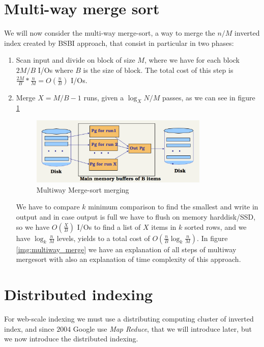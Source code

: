 \section{Multi-way merge sort}
We will now consider the multi-way merge-sort, a way to merge the $n/M$ inverted index created by BSBI approach, that consist
in particular in two phases:
\begin{enumerate}
    \item Scan input and divide on block of size $M$, where we have for each block $2M/B$ I/Os where $B$ 
	  is the size of block.\newline
	  The total cost of this step is $\frac{2M}{B} * \frac{n}{M} = O(\frac{n}{B})$ I/Os.
    \item Merge $X = M/B-1$ runs, given a $\log_X N/M$ passes, as we can see in figure \ref{img:multiWayMerging}

	  \begin{figure}
	      \includegraphics[width=0.8\textwidth]{Images/multiwayMerge}
	      \caption{Multiway Merge-sort merging}
	      \label{img:multiWayMerging}
	  \end{figure}
	  We have to compare $k$ minimum comparison to find the smallest and write in output and in case 
	  output is full we have to flush on memory harddisk/SSD, so we have $O(\frac{X}{B})$ I/Os to find
	  a list of $X$ items in $k$ sorted rows, and we have $\log _k \frac{n}{M}$ levels,
	  yields to a total cost of $O(\frac{n}{B} \log_k \frac{n}{M})$.\newline
          In figure \ref{img:multiway_merge} we have an explanation of all steps of multiway mergesort with also an 
	  explanation of time complexity of this approach.

\end{enumerate}

\section{Distributed indexing}
For web-scale indexing we must use a distributing computing cluster of inverted index, and since $2004$
Google use \emph{Map Reduce}, that we will introduce later, but we now introduce the distributed indexing.

